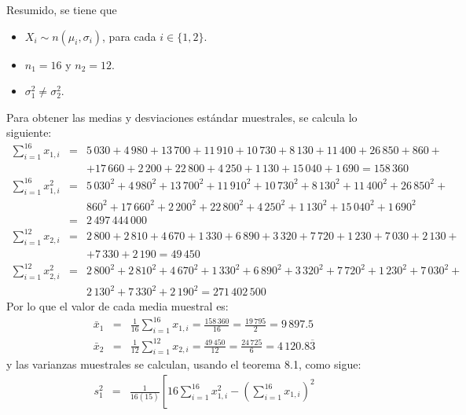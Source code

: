 \begin{solucion}
 \begin{datos}
  Resumido, se tiene que
  \begin{itemize}
   \item $X_i \sim n\left( \mu_i, \sigma_i \right)$,
   para cada $i \in \{ 1, 2 \}$.
   \item $n_1 = 16$ y $n_2 = 12$.
   \item $\sigma_1^2 \neq \sigma_2^2$.
  \end{itemize}
  Para obtener las medias y desviaciones est\'andar muestrales,
  se calcula lo siguiente:
  \begin{eqnarray*}
   \sum_{i=1}^{16} x_{1,i} & = &
   5\,030 + 4\,980 + 13\,700 + 11\,910 + 10\,730 + 8\,130 +
   11\,400 + 26\,850 + 860 + \\
   & & + 17\,660 + 2\,200 + 22\,800 + 4\,250 + 1\,130 +
   15\,040 + 1\,690 = 158\,360 \\
   \sum_{i=1}^{16} x_{1,i}^2 & = & 
   5\,030^2 + 4\,980^2 + 13\,700^2 + 11\,910^2 + 10\,730^2 +
   8\,130^2 + 11\,400^2 + 26\,850^2 + \\
   & & 860^2 + 17\,660^2 + 2\,200^2 + 22\,800^2 + 4\,250^2 +
   1\,130^2 + 15\,040^2 + 1\,690^2 \\
   & = & 2\,497\,444\,000 \\
   \sum_{i=1}^{12} x_{2,i} & = &
   2\,800 + 2\,810 + 4\,670 + 1\,330 + 6\,890 + 3\,320 + 7\,720 +
   1\,230 + 7\,030 + 2\,130 + \\
   & & + 7\,330 + 2\,190
   = 49\,450 \\
   \sum_{i=1}^{12} x_{2,i}^2 & = &
   2\,800^2 + 2\,810^2 + 4\,670^2 + 1\,330^2 + 6\,890^2 + 3\,320^2 +
   7\,720^2 + 1\,230^2 + 7\,030^2 + \\
   & & 2\,130^2 + 7\,330^2 + 2\,190^2
   = 271\,402\,500
  \end{eqnarray*}
  Por lo que el valor de cada media muestral es:
  \begin{eqnarray*}
   \bar{x}_1 & = & \frac{1}{16} \sum_{i=1}^{16} x_{1,i} =
   \frac{158\,360}{16} = \frac{19\,795}{2} = 9\,897.5 \\
   \bar{x}_2 & = & \frac{1}{12} \sum_{i=1}^{12} x_{2,i} =
   \frac{49\,450}{12} = \frac{24\,725}{6} = 4\,120.8\overline{3}
  \end{eqnarray*}
  y las varianzas muestrales se calculan, usando el teorema 8.1,
  como sigue:
  \begin{eqnarray*}
   s_1^2 & = &
   \frac{1}{16(15)}\left[
   16\sum_{i=1}^{16} x_{1,i}^2 -\left(\sum_{i=1}^{16} x_{1,i}\right)^2

\end{eqnarray*}
\end{datos}
\end{solucion}
